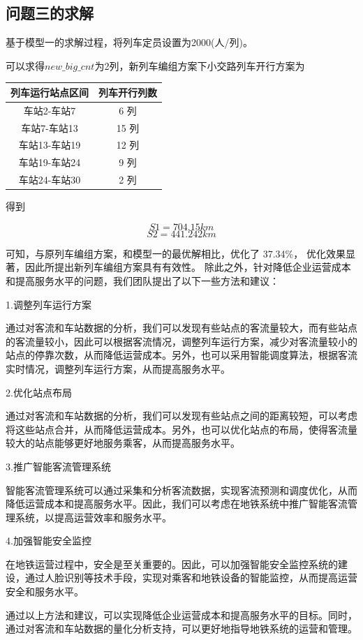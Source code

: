 \documentclass[UTF8]{ctexart}
\begin{document}
\subsection{问题三的求解}
基于模型一的求解过程，将列车定员设置为2000(人/列)。\par
可以求得$new\_big\_cnt$为2列，新列车编组方案下小交路列车开行方案为\par
	\begin{center}
	\begin{tabular}{c|c} 
		\textbf{列车运行站点区间} & \textbf{列车开行列数} \\
		\hline
		车站2-车站7 & 6 列 \\
		车站7-车站13 & 15 列 \\
		车站13-车站19 & 12 列 \\
		车站19-车站24 & 9 列 \\
		车站24-车站30 & 2 列 \\
	\end{tabular}
\end{center}\par
得到\par
$$
S1=704.15km
$$
$$
S2=441.242km
$$\par
可知，与原列车编组方案，和模型一的最优解相比，优化了 37.34\%， 优化效果显著，因此所提出新列车编组方案具有有效性。
除此之外，针对降低企业运营成本和提高服务水平的问题，我们团队提出了以下一些方法和建议：\par
1.调整列车运行方案\par
通过对客流和车站数据的分析，我们可以发现有些站点的客流量较大，而有些站点的客流量较小，因此可以根据客流情况，调整列车运行方案，减少对客流量较小的站点的停靠次数，从而降低运营成本。另外，也可以采用智能调度算法，根据客流实时情况，调整列车运行方案，从而提高服务水平。\par
2.优化站点布局\par
通过对客流和车站数据的分析，我们可以发现有些站点之间的距离较短，可以考虑将这些站点合并，从而降低运营成本。另外，也可以优化站点的布局，使得客流量较大的站点能够更好地服务乘客，从而提高服务水平。\par
3.推广智能客流管理系统\par
智能客流管理系统可以通过采集和分析客流数据，实现客流预测和调度优化，从而降低运营成本和提高服务水平。因此，我们可以考虑在地铁系统中推广智能客流管理系统，以提高运营效率和服务水平。\par
4.加强智能安全监控\par
在地铁运营过程中，安全是至关重要的。因此，可以加强智能安全监控系统的建设，通过人脸识别等技术手段，实现对乘客和地铁设备的智能监控，从而提高运营安全和服务水平。\par
通过以上方法和建议，可以实现降低企业运营成本和提高服务水平的目标。同时，通过对客流和车站数据的量化分析支持，可以更好地指导地铁系统的运营和管理。\par
\end{document}

